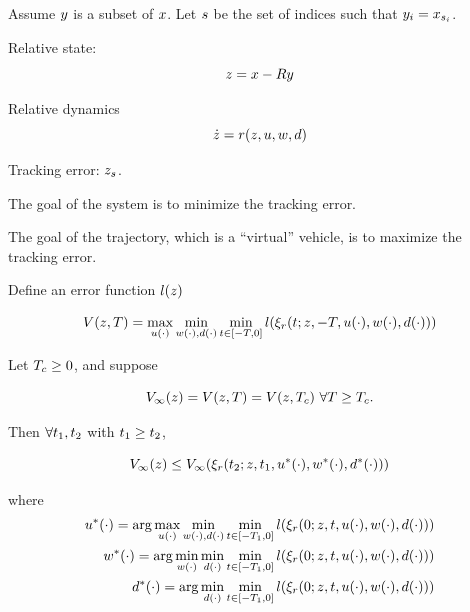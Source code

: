  Assume $y$ is a subset of $x$. Let $s$ be the set of indices such that $y_i = x_{s_i}$.
 
 Relative state:
 \begin{equation}
 z = x - Ry
 \end{equation}
 
 Relative dynamics
 \begin{equation}
 \dot{z} = r(z, u, w, d)
 \end{equation}
 
 Tracking error: $z_{s}$.
 
 The goal of the system is to minimize the tracking error.
 
 The goal of the trajectory, which is a ``virtual'' vehicle, is to maximize the tracking error.
 
 Define an error function $l(z)$
 
 \begin{equation}
 V(z, T) = \max_{u(\cdot)} \min_{w(\cdot), d(\cdot)} \min_{t \in [-T, 0]} l(\xi_r(t; z, -T, u(\cdot), w(\cdot), d(\cdot))) 
 \end{equation}
 
 \begin{thm}
   Let $T_c \ge 0$, and suppose
   
   \begin{equation}
   \label{eq:conv_valfunc}
   V_\infty(z) = V(z, T) = V(z, T_c) ~ \forall T \ge T_c.
   \end{equation}
   
   Then $\forall t_1, t_2$ with $t_1 \ge t_2$,
   
   \begin{equation}
   V_\infty(z) \le V_\infty(\xi_r(t_2; z, t_1, u^*(\cdot), w^*(\cdot), d^*(\cdot))) 
   \end{equation}
   
   \noindent where
   \begin{equation}
   \begin{aligned}
   u^*(\cdot) = \arg \max_{u(\cdot)} \min_{w(\cdot), d(\cdot)} \min_{t \in [-T_1, 0]} l(\xi_r(0; z, t, u(\cdot), w(\cdot), d(\cdot))) \\
   w^*(\cdot) = \arg \min_{w(\cdot)} \min_{d(\cdot)} \min_{t \in [-T_1, 0]} l(\xi_r(0; z, t, u(\cdot), w(\cdot), d(\cdot))) \\
   d^*(\cdot) = \arg \min_{d(\cdot)} \min_{t \in [-T_1, 0]} l(\xi_r(0; z, t, u(\cdot), w(\cdot), d(\cdot))) 
   \end{aligned}
   \end{equation}
   
 \end{thm}
 
